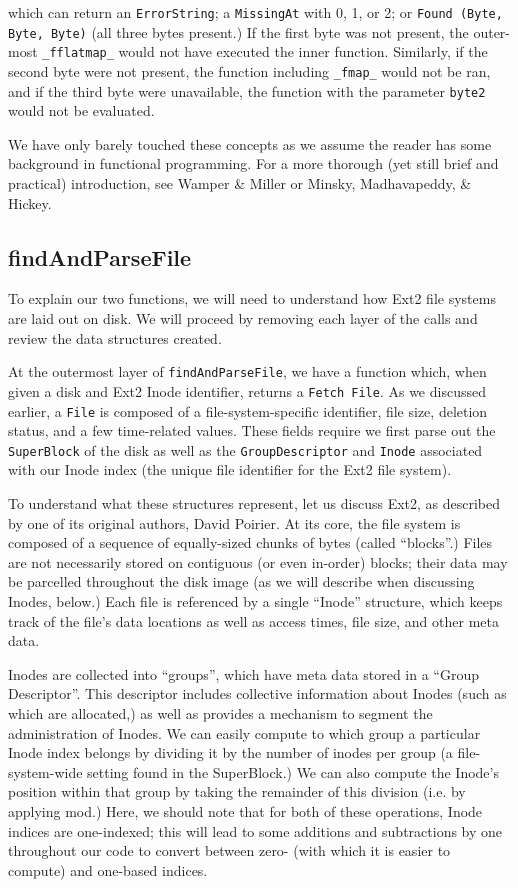 \documentclass[nocopyrightspace,preprint]{sigplanconf}
\begin{document}
which can return an {\tt ErrorString}; a {\tt MissingAt} with 0, 1, or 2; or
{\tt Found (Byte, Byte, Byte)} (all three bytes present.) If the first byte
was not present, the outer-most {\tt \_fflatmap\_} would not have executed the
inner function. Similarly, if the second byte were not present, the function
including {\tt \_fmap\_} would not be ran, and if the third byte were
unavailable, the function with the parameter {\tt byte2} would not be
evaluated.

We have only barely touched these concepts as we assume the reader has some
background in functional programming. For a more thorough (yet still brief and
practical) introduction, see Wamper \& Miller\cite{scala} or Minsky,
Madhavapeddy, \& Hickey\cite{ocaml}.

\subsection{findAndParseFile}

To explain our two functions, we will need to understand how Ext2 file systems
are laid out on disk. We will proceed by removing each layer of the calls and
review the data structures created.

At the outermost layer of {\tt findAndParseFile}, we have a function which,
when given a disk and Ext2 Inode identifier, returns a {\tt Fetch File}. As we
discussed earlier, a {\tt File} is composed of a file-system-specific
identifier, file size, deletion status, and a few time-related values.  These
fields require we first parse out the {\tt SuperBlock} of the disk as well as
the {\tt GroupDescriptor} and {\tt Inode} associated with our Inode index (the
unique file identifier for the Ext2 file system).

To understand what these structures represent, let us discuss Ext2, as
described by one of its original authors, David Poirier\cite{non-gnu}. At its
core, the file system is composed of a sequence of equally-sized chunks of
bytes (called ``blocks''.) Files are not necessarily stored on contiguous (or
even in-order) blocks; their data may be parcelled throughout the disk image
(as we will describe when discussing Inodes, below.) Each file is referenced
by a single ``Inode'' structure, which keeps track of the file's data
locations as well as access times, file size, and other meta data. 

Inodes are collected into ``groups'', which have meta data stored in a ``Group
Descriptor''. This descriptor includes collective information about Inodes
(such as which are allocated,) as well as provides a mechanism to segment the
administration of Inodes. We can easily compute to which group a particular
Inode index belongs by dividing it by the number of inodes per group (a
file-system-wide setting found in the SuperBlock.) We can also compute the
Inode's position within that group by taking the remainder of this division
(i.e. by applying mod.) Here, we should note that for both of these
operations, Inode indices are one-indexed; this will lead to some additions
and subtractions by one throughout our code to convert between zero- (with
which it is easier to compute) and one-based indices.
\end{document}
